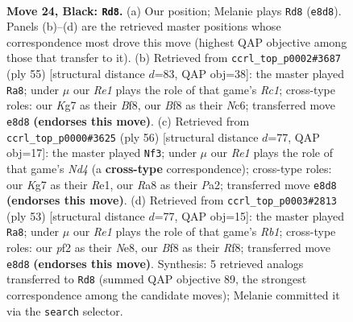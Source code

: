 \documentclass[11pt]{article}
\begin{document}
\clearpage

\begin{figure}[p]\centering
\begin{subfigure}{0.46\textwidth}\centering
\resizebox{\linewidth}{!}{%
\newchessgame
\chessboard[
  setfen={rnb1rb2/ppp1pBk1/5n2/P1P3N1/8/6R1/1P3P2/RNB1K3 b Q - 6 24},
  showmover=false,
  pgfstyle=straightmove, color=movearrow, markmove={e8-d8}
]}
\caption{}
\end{subfigure}\hfill
\begin{subfigure}{0.46\textwidth}\centering
\resizebox{\linewidth}{!}{%
\newchessgame
\chessboard[
  setfen={2r2bk1/p5p1/1pnN1r1p/3R4/1PP3P1/P5B1/7P/2R4K b - - 1 28},
  showmover=false,
  pgfstyle=straightmove, color=movearrow, markmove={c8-a8}
]}
\caption{}
\end{subfigure}
\\[4pt]
\begin{subfigure}{0.46\textwidth}\centering
\resizebox{\linewidth}{!}{%
\newchessgame
\chessboard[
  setfen={4r1k1/pp1b1n1p/4p1p1/3pb3/3N3P/1P1R4/P2B1PP1/4R1K1 w - - 1 29},
  showmover=false,
  pgfstyle=straightmove, color=movearrow, markmove={d4-f3}
]}
\caption{}
\end{subfigure}\hfill
\begin{subfigure}{0.46\textwidth}\centering
\resizebox{\linewidth}{!}{%
\newchessgame
\chessboard[
  setfen={1rb1nr1k/7p/1nNp4/p2P1p2/1P6/7P/N1P5/R3KBR1 b Q - 1 27},
  showmover=false,
  pgfstyle=straightmove, color=movearrow, markmove={b8-a8}
]}
\caption{}
\end{subfigure}
\caption{\textbf{Move 24, Black: \texttt{Rd8}.} (a) Our position; Melanie plays \texttt{Rd8} (\texttt{e8d8}). Panels (b)--(d) are the retrieved master positions whose correspondence most drove this move (highest QAP objective among those that transfer to it). (b) Retrieved from \texttt{ccrl\_top\_p0002\#3687} (ply 55) [structural distance $d$=83, QAP obj=38]: the master played \texttt{Ra8}; under $\mu$ our \emph{Re1} plays the role of that game's \emph{Rc1}; cross-type roles: our \emph{K}g7 as their \emph{B}f8, our \emph{B}f8 as their \emph{N}c6; transferred move \texttt{e8d8} \textbf{(endorses this move)}. (c) Retrieved from \texttt{ccrl\_top\_p0000\#3625} (ply 56) [structural distance $d$=77, QAP obj=17]: the master played \texttt{Nf3}; under $\mu$ our \emph{Re1} plays the role of that game's \emph{Nd4} (a \textbf{cross-type} correspondence); cross-type roles: our \emph{K}g7 as their \emph{R}e1, our \emph{R}a8 as their \emph{P}a2; transferred move \texttt{e8d8} \textbf{(endorses this move)}. (d) Retrieved from \texttt{ccrl\_top\_p0003\#2813} (ply 53) [structural distance $d$=77, QAP obj=15]: the master played \texttt{Ra8}; under $\mu$ our \emph{Re1} plays the role of that game's \emph{Rb1}; cross-type roles: our \emph{p}f2 as their \emph{N}e8, our \emph{B}f8 as their \emph{R}f8; transferred move \texttt{e8d8} \textbf{(endorses this move)}. Synthesis: 5 retrieved analogs transferred to \texttt{Rd8} (summed QAP objective 89, the strongest correspondence among the candidate moves); Melanie committed it via the \texttt{search} selector.}
\label{fig:thought-m47}
\end{figure}
\end{document}
